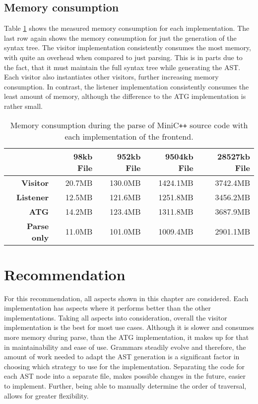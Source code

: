 \subsection{Memory consumption}

Table \ref{tab:ParseMemory} shows the measured memory consumption for each implementation. The last row again shows the memory consumption for just the generation of the syntax tree. The visitor implementation consistently consumes the most memory, with quite an overhead when compared to just parsing. This is in parts due to the fact, that it must maintain the full syntax tree while generating the AST. Each visitor also instantiates other visitors, further increasing memory consumption. In contrast, the listener implementation consistently consumes the least amount of memory, although the difference to the ATG implementation is rather small. 


\begin{table}[!ht]
    \centering
    \caption{Memory consumption during the parse of MiniC\texttt{++} source code with each implementation of the frontend.}
    \label{tab:ParseMemory}
    \begin{tabular}{|r|r|r|r|r|}
    \hline
         & 98kb File & 952kb File & 9504kb File & 28527kb File \\ \hline
        \textbf{Visitor} & 20.7MB & 130.0MB & 1424.1MB & 3742.4MB \\ \hline
        \textbf{Listener} & 12.5MB & 121.6MB & 1251.8MB & 3456.2MB \\ \hline
        \textbf{ATG} & 14.2MB & 123.4MB & 1311.8MB & 3687.9MB \\ \hline
        \textbf{Parse only} & 11.0MB & 101.0MB & 1009.4MB & 2901.1MB \\ \hline
    \end{tabular}
\end{table}


\section{Recommendation}

For this recommendation, all aspects shown in this chapter are considered. Each implementation has aspects where it performs better than the other implementations. Taking all aspects into consideration, overall the visitor implementation is the best for most use cases. Although it is slower and consumes more memory during parse, than the ATG implementation, it makes up for that in maintainability and ease of use. Grammars steadily evolve and therefore, the amount of work needed to adapt the AST generation is a significant factor in choosing which strategy to use for the implementation. Separating the code for each AST node into a separate file, makes possible changes in the future, easier to implement. Further, being able to manually determine the order of traversal, allows for greater flexibility.

